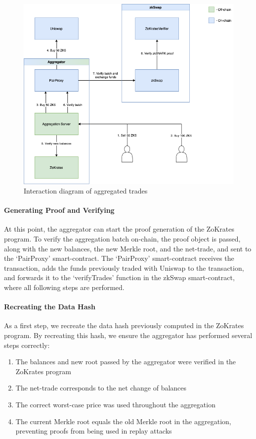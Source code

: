 \documentclass[../../thesis.tex]{subfiles}
\begin{document}
\begin{figure}[h]
    \centerline{\includegraphics[totalheight=10cm]{diagrams/tradeAggrFlow.png}}
    \caption{Interaction diagram of aggregated trades}
    \label{fig:zokrates}
\end{figure}

\paragraph{Generating Proof and Verifying}
At this point, the aggregator can start the proof generation of the ZoKrates program. To verify the aggregation batch on-chain, the proof object is passed, along with the new balances, the new Merkle root, and the net-trade, and sent to the `PairProxy' smart-contract. The `PairProxy' smart-contract receives the transaction, adds the funds previously traded with Uniswap to the transaction, and forwards it to the `verifyTrades' function in the zkSwap smart-contract, where all following steps are performed. 

\paragraph{Recreating the Data Hash}
As a first step, we recreate the data hash previously computed in the ZoKrates program. By recreating this hash, we ensure the aggregator has performed several steps correctly:

\begin{enumerate}
    \item The balances and new root passed by the aggregator were verified in the ZoKrates program
    \item The net-trade corresponds to the net change of balances
    \item The correct worst-case price was used throughout the aggregation
    \item The current Merkle root equals the old Merkle root in the aggregation, preventing proofs from being used in replay attacks
\end{enumerate}
\end{document}
